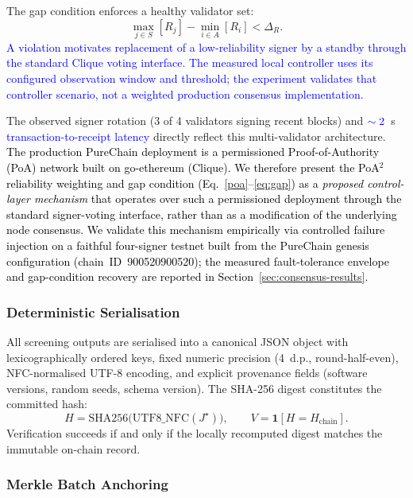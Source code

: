 \documentclass[conference]{IEEEtran}
\newcommand{\rev}[2]{\textcolor{blue}{#2}}
\begin{document}
The gap condition enforces a healthy validator set:
\begin{equation}
\label{eq:gap}
\max_{j\in S}[R_j] - \min_{i\in A}[R_i] < \Delta_R.
\end{equation}
\rev{R1.3, R2.4}{A violation motivates replacement of a low-reliability signer by a standby through the standard Clique voting interface. The measured local controller uses its configured observation window and threshold; the experiment validates that controller scenario, not a weighted production consensus implementation.}

The observed signer rotation (3 of 4 validators signing
recent blocks) and $\rev{R2.4}{\sim 2}$~s \rev{R2.4}{transaction-to-receipt latency} directly
reflect this multi-validator architecture.
\textcolor{black}{The production PureChain deployment is a
permissioned Proof-of-Authority (PoA) network built on
go-ethereum (Clique). We therefore present the PoA$^2$
reliability weighting and gap condition
(Eq.~\ref{poa}--\ref{eq:gap}) as a \emph{proposed
control-layer mechanism} that operates over such a
permissioned deployment through the standard signer-voting
interface, rather than as a modification of the underlying
node consensus. We validate this mechanism empirically via
controlled failure injection on a faithful four-signer
testnet built from the PureChain genesis configuration
(chain~ID~900520900520); the measured fault-tolerance
envelope and gap-condition recovery are reported in
Section~\ref{sec:consensus-results}.}

\subsubsection{Deterministic Serialisation}

All screening outputs are serialised into a canonical JSON
object with lexicographically ordered keys, fixed numeric
precision (4~d.p., round-half-even), NFC-normalised UTF-8
encoding, and explicit provenance fields (software versions,
random seeds, schema version).
The SHA-256 digest constitutes the committed hash:
\begin{equation}
\label{eq:hash}
H = \mathrm{SHA256}\!\bigl(\mathrm{UTF8\_NFC}(J^\star)\bigr),
\qquad
V = \mathbf{1}[H = H_{\mathrm{chain}}].
\end{equation}
Verification succeeds if and only if the locally recomputed
digest matches the immutable on-chain record.

\subsubsection{Merkle Batch Anchoring}
\end{document}
